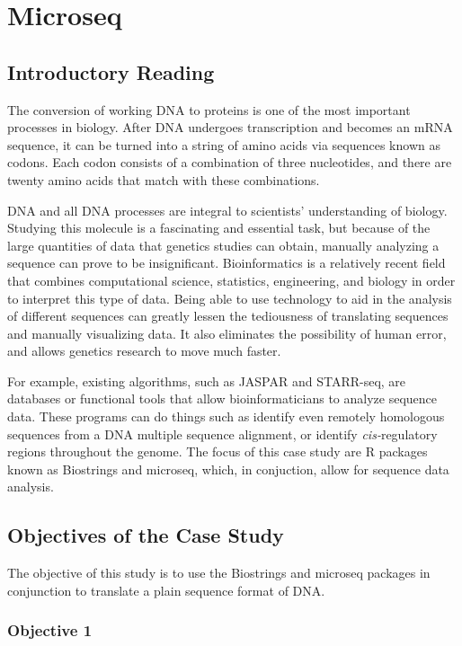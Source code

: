 \chapter{Microseq}
\section{Introductory Reading}


The conversion of working DNA to proteins is one of the most important processes in biology. After DNA undergoes transcription and becomes an mRNA sequence, it can be turned into a string of amino acids via sequences known as codons. Each codon consists of a combination of three nucleotides, and there are twenty amino acids that match with these combinations.

DNA and all DNA processes are integral to scientists' understanding of biology. Studying this molecule is a fascinating and essential task, but because of the large quantities of data that genetics studies can obtain, manually analyzing a sequence can prove to be insignificant. Bioinformatics is a relatively recent field that combines computational science, statistics, engineering, and biology in order to interpret this type of data. Being able to use technology to aid in the analysis of different sequences can greatly lessen the tediousness of translating sequences and manually visualizing data. It also eliminates the possibility of human error, and allows genetics research to move much faster.

For example, existing algorithms, such as JASPAR and STARR-seq, are databases or functional tools that allow bioinformaticians to analyze sequence data. These programs can do things such as identify even remotely homologous sequences from a DNA multiple sequence alignment, or identify \textit{cis-}regulatory regions throughout the genome. \cite{jaspar} The focus of this case study are R packages known as Biostrings and microseq, which, in conjuction, allow for sequence data analysis. 

\section{Objectives of the Case Study}

The objective of this study is to use the Biostrings and microseq packages in conjunction to translate a plain sequence format of DNA.

\subsection{Objective 1}

